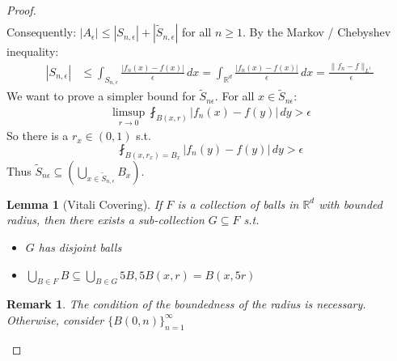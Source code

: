 \documentclass{report}
\theoremstyle{tommy}
\newtheorem{lem}[defn]{Lemma}
\newtheorem{rem}[defn]{Remark}
\begin{document}
\begin{proof}
\begin{align*}
    \end{align*}
    Consequently: \(|A_\epsilon| \le |S_{n, \epsilon}| + |\tilde S_{n, \epsilon}|\) for all \(n \ge 1\). By the Markov / Chebyshev inequality:
    \begin{align*}
      |S_{n, \epsilon}| 
      &\le \int_{S_{n, \epsilon}} \frac{|f_n(x) - f(x)|}{\epsilon} \, dx
      = \int_{\mathbb{R}^d} \frac{|f_n(x) - f(x)|}{\epsilon} \, dx
      = \frac{\|f_n - f\|_{L^1}}{\epsilon}
    \end{align*}
    We want to prove a simpler bound for \(\tilde S_{n \epsilon}\). For all \(x \in \tilde S_{n \epsilon}\): 
    \begin{align*}
      \limsup_{r \to 0} \fint_{B(x, r)} |f_n(x) - f(y)| \, dy > \epsilon
    \end{align*}
    So there is a \(r_x \in (0,1)\) s.t.
    \[\fint_{B(x,r_x) = B_x} |f_n(y) - f(y)| \, dy > \epsilon\]
    Thus \(\tilde S_{n \epsilon} \subseteq \left(\bigcup_{x \in \tilde S_{n, \epsilon}} B_x\right)\). 
    
    \begin{lem}[Vitali Covering]
      If \(F\) is a collection of balls in \(\mathbb{R}^d\) with bounded radius, then there exists a sub-collection \(G \subseteq F\) s.t.
      \begin{itemize}
        \item \(G\) has disjoint balls
        \item \(\bigcup_{B \in F} B \subseteq \bigcup_{B \in G} 5B, 5B(x,r) = B(x, 5r)\)
      \end{itemize}
    \end{lem}

    \begin{rem}
      The condition of the boundedness of the radius is necessary. Otherwise, consider \(\{B(0,n)\}_{n=1}^\infty\)
    \end{rem}


\end{proof}
\end{document}
